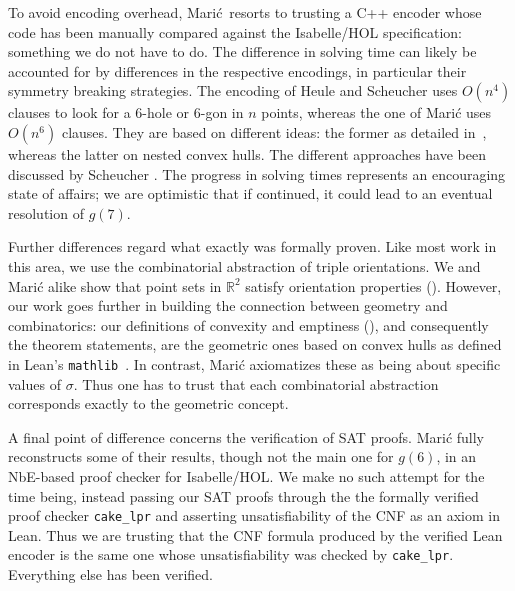 To avoid encoding overhead,
Marić resorts to trusting a C++ encoder
whose code has been manually compared against the Isabelle/HOL specification:
something we do not have to do.
The difference in solving time
can likely be accounted for by differences in the respective encodings,
in particular their symmetry breaking strategies.
The encoding of Heule and Scheucher uses $O(n^4)$ clauses
to look for a $6$-hole or $6$-gon in $n$ points,
whereas the one of Marić uses $O(n^6)$ clauses.
They are based on different ideas:
the former as detailed in~,
whereas the latter on nested convex hulls.
The different approaches have been discussed by Scheucher \cite{scheucherTwoDisjoint5holes2020}.
The progress in solving times
represents an encouraging state of affairs;
we are optimistic that if continued,
it could lead to an eventual resolution of $g(7)$.

Further differences regard what exactly was formally proven.
Like most work in this area,
we use the combinatorial abstraction of triple orientations.
We and Marić alike show that point sets in $\mathbb R^2$
satisfy orientation properties ().
However, our work goes further in building the connection
between geometry and combinatorics:
our definitions of convexity and emptiness (),
and consequently the theorem statements,
are the geometric ones based on convex hulls
as defined in Lean's \texttt{mathlib}~\cite{The_mathlib_Community_2020}.
In contrast, Marić axiomatizes these as being about specific values of $\sigma$.
Thus one has to trust that each combinatorial abstraction
corresponds exactly to the geometric concept.

A final point of difference concerns the verification of SAT proofs.
Marić fully reconstructs some of their results,
though not the main one for $g(6)$,
in an NbE-based proof checker for Isabelle/HOL.
We make no such attempt for the time being,
instead passing our SAT proofs through the the formally verified proof checker \texttt{cake\_lpr} \cite{tanVerifiedPropagationRedundancy2023}
and asserting unsatisfiability of the CNF as an axiom in Lean.
Thus we are trusting that the CNF formula produced by the verified Lean encoder
is the same one whose unsatisfiability was checked by \texttt{cake\_lpr}.
Everything else has been verified.




